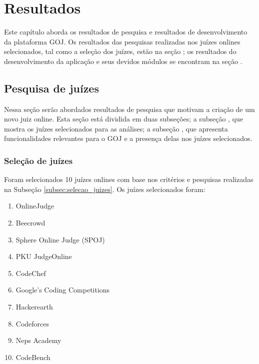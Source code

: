 \chapter{Resultados}
\label{cap:resultados}

Este capítulo aborda os resultados de pesquisa e resultados de desenvolvimento da plataforma GOJ. Os resultados das pesquisas realizadas nos juízes onlines selecionados, tal como a seleção dos juízes, estão na seção ; os resultados do desenvolvimento da aplicação e seus devidos módulos se encontram na seção .

\section{Pesquisa de juízes}
\label{sec:pesquisa_juizes}

Nessa seção serão abordados resultados de pesquisa que motivam a criação de um novo juiz online. Esta seção está dividida em duas subseções; a subseção , que mostra os juízes selecionados para as análises; a subseção , que apresenta funcionalidades relevantes para o GOJ e a presença delas nos juízes selecionados.

\subsection{Seleção de juízes}
\label{subsec:resultados_selecao_juizes}

Foram selecionados 10 juízes onlines com base nos critérios e pesquisas realizadas na Subseção \ref{subsec:selecao_juizes}. Os juízes selecionados foram:

\begin{enumerate}
    \item OnlineJudge
    \item Beecrowd
    \item Sphere Online Judge (SPOJ)
    \item PKU JudgeOnline
    \item CodeChef
    \item Google's Coding Competitions
    \item Hackerearth
    \item Codeforces
    \item Neps Academy 
    \item CodeBench
\end{enumerate}


